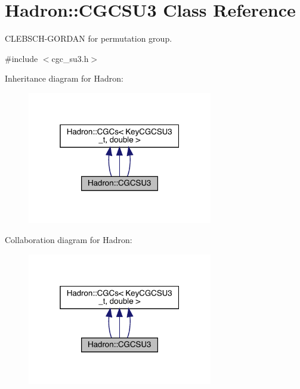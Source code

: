 \hypertarget{classHadron_1_1CGCSU3}{}\section{Hadron\+:\+:C\+G\+C\+S\+U3 Class Reference}
\label{classHadron_1_1CGCSU3}


C\+L\+E\+B\+S\+C\+H-\/\+G\+O\+R\+D\+AN for permutation group.  




{\ttfamily \#include $<$cgc\+\_\+su3.\+h$>$}



Inheritance diagram for Hadron\+:
\nopagebreak
\begin{figure}[H]
\begin{center}
\leavevmode
\includegraphics[width=229pt]{dd/d57/classHadron_1_1CGCSU3__inherit__graph}
\end{center}
\end{figure}


Collaboration diagram for Hadron\+:
\nopagebreak
\begin{figure}[H]
\begin{center}
\leavevmode
\includegraphics[width=229pt]{d0/d57/classHadron_1_1CGCSU3__coll__graph}
\end{center}
\end{figure}
